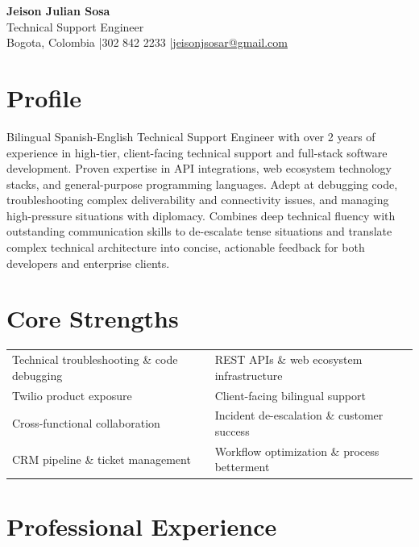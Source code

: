 \documentclass[10pt,letterpaper]{article}
\newcommand{\contactsep}{\hspace{0.55em}\textcolor{accent}{|}\hspace{0.55em}}
\newcommand{\cvtag}[1]{%
  \begingroup
  \setlength{\fboxsep}{3pt}%
  \colorbox{soft}{\textcolor{ink}{\footnotesize #1}}%
  \endgroup
}
\begin{document}
{\Huge\bfseries\color{ink} Jeison Julian Sosa}\\[3pt]
{\large\color{accent} Technical Support Engineer}\\[6pt]
{\small
Bogota, Colombia
\contactsep 302 842 2233
\contactsep \href{mailto:jeisonjsosar@gmail.com}{jeisonjsosar@gmail.com}
}

\vspace{8pt}

\section{Profile}
Bilingual Spanish-English Technical Support Engineer with over 2 years of experience in high-tier, client-facing technical support and full-stack software development. Proven expertise in API integrations, web ecosystem technology stacks, and general-purpose programming languages. Adept at debugging code, troubleshooting complex deliverability and connectivity issues, and managing high-pressure situations with diplomacy. Combines deep technical fluency with outstanding communication skills to de-escalate tense situations and translate complex technical architecture into concise, actionable feedback for both developers and enterprise clients.

\section{Core Strengths}
\begin{tabularx}{\textwidth}{@{}>{\raggedright\arraybackslash}X>{\raggedright\arraybackslash}X@{}}
\cvtag{Technical troubleshooting \& code debugging} & \cvtag{REST APIs \& web ecosystem infrastructure} \\
\cvtag{Twilio product exposure} & \cvtag{Client-facing bilingual support} \\
\cvtag{Cross-functional collaboration} & \cvtag{Incident de-escalation \& customer success} \\
\cvtag{CRM pipeline \& ticket management} & \cvtag{Workflow optimization \& process betterment} \\
\end{tabularx}

\section{Professional Experience}
\end{document}
